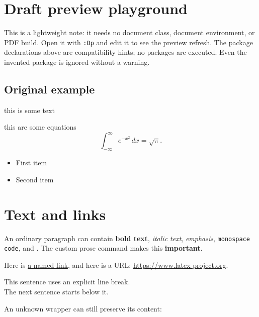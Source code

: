 \usepackage{amsmath,amssymb,hyperref}
\usepackage{an-optional-package}
\newcommand{\R}{\mathbb{R}}
\newcommand{\vect}[1]{\mathbf{#1}}
\newcommand{\inner}[2]{\langle #1,#2\rangle}
\newcommand{\important}[1]{\textbf{#1}}
\newcommand{\N}{\mathbb{N}}
\renewcommand{\N}{\mathbb{N}_0}
\DeclareMathOperator{\rank}{rank}

\section{Draft preview playground}
This is a lightweight note: it needs no document class, document environment,
or PDF build. Open it with \texttt{:Dp} and edit it to see the preview refresh.
The package declarations above are compatibility hints; no packages are executed.
Even the invented package is ignored without a warning.

\subsection{Original example}
this is some text

this are some equations
\begin{equation}
  \int_{-\infty}^{\infty} e^{-x^2}\,dx = \sqrt{\pi}.
\end{equation}

\begin{itemize}
  \item First item
  \item Second item
\end{itemize}


\section{Text and links}
An ordinary paragraph can contain \textbf{bold text}, \textit{italic text},
\emph{emphasis}, \texttt{monospace code}, and .
The custom prose command makes this \important{important}.

Here is \href{https://www.latex-project.org}{a named link}, and here is a URL:
\url{https://www.latex-project.org}.

This sentence uses an explicit line break.\\The next sentence starts below it.

An unknown wrapper can still preserve its content:

